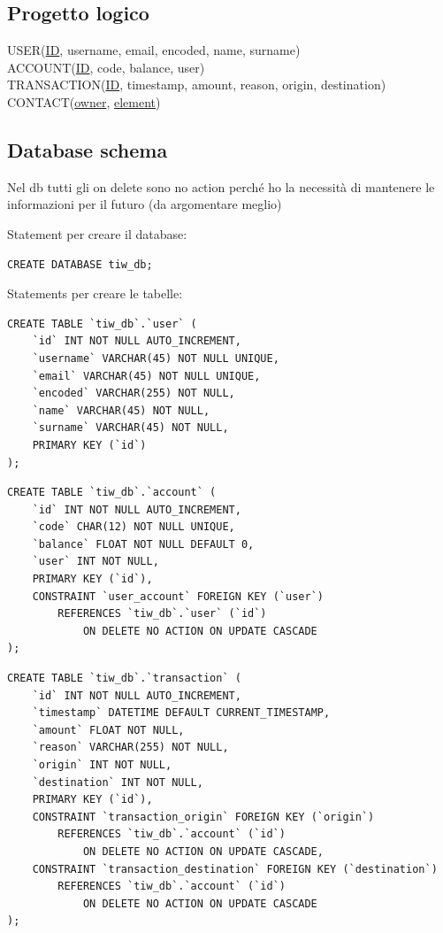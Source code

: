\documentclass{article}
\begin{document}
\subsection{Progetto logico}
USER(\underline{ID}, username, email, encoded, name, surname)
\\
ACCOUNT(\underline{ID}, code, balance, user)
\\
TRANSACTION(\underline{ID}, timestamp, amount, reason, origin, destination)
\\
CONTACT(\underline{owner}, \underline{element})

\subsection{Database schema}
Nel db tutti gli on delete sono no action perché ho la necessità di mantenere le informazioni per il futuro (da argomentare meglio)

Statement per creare il database:
\begin{verbatim}
CREATE DATABASE tiw_db;
\end{verbatim}

Statements per creare le tabelle: 
\begin{verbatim}
CREATE TABLE `tiw_db`.`user` (
	`id` INT NOT NULL AUTO_INCREMENT,
	`username` VARCHAR(45) NOT NULL UNIQUE,
	`email` VARCHAR(45) NOT NULL UNIQUE,
	`encoded` VARCHAR(255) NOT NULL,
	`name` VARCHAR(45) NOT NULL,
	`surname` VARCHAR(45) NOT NULL,
	PRIMARY KEY (`id`)
);
\end{verbatim}

\begin{verbatim}
CREATE TABLE `tiw_db`.`account` (
	`id` INT NOT NULL AUTO_INCREMENT,
	`code` CHAR(12) NOT NULL UNIQUE,
	`balance` FLOAT NOT NULL DEFAULT 0,
	`user` INT NOT NULL,
	PRIMARY KEY (`id`),
	CONSTRAINT `user_account` FOREIGN KEY (`user`) 
		REFERENCES `tiw_db`.`user` (`id`) 
			ON DELETE NO ACTION ON UPDATE CASCADE
);
\end{verbatim}

\begin{verbatim}
CREATE TABLE `tiw_db`.`transaction` (
	`id` INT NOT NULL AUTO_INCREMENT,
	`timestamp` DATETIME DEFAULT CURRENT_TIMESTAMP,
	`amount` FLOAT NOT NULL,
	`reason` VARCHAR(255) NOT NULL,
	`origin` INT NOT NULL,
	`destination` INT NOT NULL,
	PRIMARY KEY (`id`),
	CONSTRAINT `transaction_origin` FOREIGN KEY (`origin`) 
		REFERENCES `tiw_db`.`account` (`id`)
			ON DELETE NO ACTION ON UPDATE CASCADE,
	CONSTRAINT `transaction_destination` FOREIGN KEY (`destination`) 
		REFERENCES `tiw_db`.`account` (`id`) 
			ON DELETE NO ACTION ON UPDATE CASCADE
);
\end{verbatim}
\pagebreak
\end{document}
